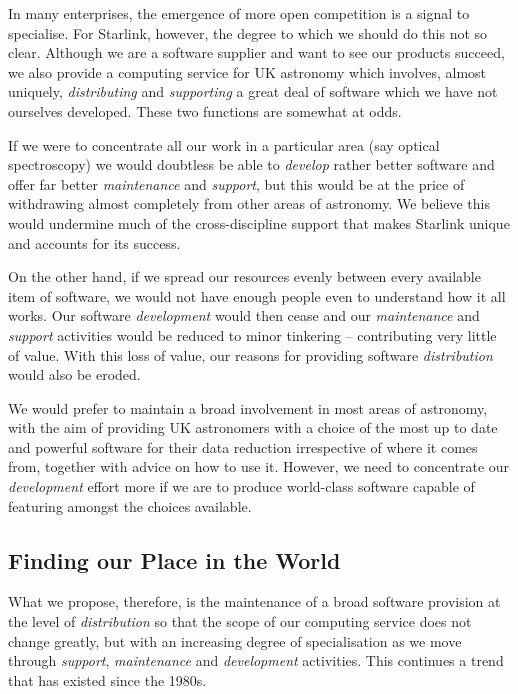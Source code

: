 \documentclass[twoside,11pt]{article}
\newcommand{\htmlref}[2]{#1}
\newcommand{\st}[1]{{\em{#1}}}
\newcommand{\dev}[1]{\htmlref{#1}{development}}
\newcommand{\dis}[1]{\htmlref{#1}{distribution}}
\newcommand{\mnt}[1]{\htmlref{#1}{maintenance}}
\newcommand{\spt}[1]{\htmlref{#1}{support}}
\begin{document}
In many enterprises, the emergence of more open competition is a
signal to specialise. For Starlink, however, the degree to which we
should do this not so clear. Although we are a software supplier and
want to see our products succeed, we also provide a computing service
for UK astronomy which involves, almost uniquely,
\st{\dis{distributing}} and \st{\spt{supporting}} a great deal of
software which we have not ourselves developed. These two functions
are somewhat at odds.

If we were to concentrate all our work in a particular area (say
optical spectroscopy) we would doubtless be able to \st{\dev{develop}}
rather better software and offer far better \st{\mnt{maintenance}} and
\st{support}, but this would be at the price of withdrawing almost
completely from other areas of astronomy.  We believe this would
undermine much of the cross-discipline support that makes Starlink
unique and accounts for its success.

On the other hand, if we spread our resources evenly between every
available item of software, we would not have enough people even to
understand how it all works. Our software \st{development} would then
cease and our \st{maintenance} and \st{support} activities would be
reduced to minor tinkering -- contributing very little of value. With
this loss of value, our reasons for providing software
\st{\dis{distribution}} would also be eroded.

We would prefer to maintain a broad involvement in most areas of
astronomy, with the aim of providing UK astronomers with a choice of
the most up to date and powerful software for their data reduction
irrespective of where it comes from, together with advice on how to
use it. However, we need to concentrate our \st{development} effort
more if we are to produce world-class software capable of featuring
amongst the choices available.

\subsection{Finding our Place in the World}

What we propose, therefore, is the maintenance of a broad software
provision at the level of \st{\dis{distribution}} so that the scope of our
computing service does not change greatly, but with an increasing
degree of specialisation as we move through \st{\spt{support}},
\st{\mnt{maintenance}} and \st{\dev{development}} activities. This continues a
trend that has existed since the 1980s.
\end{document}
